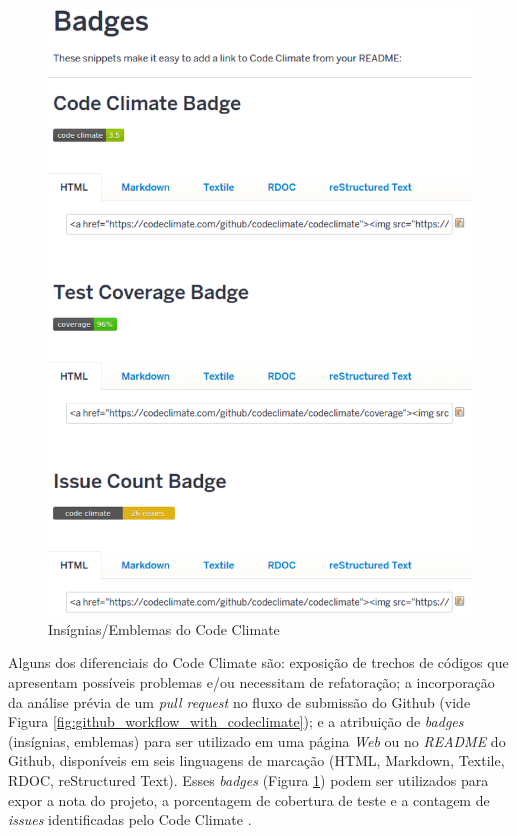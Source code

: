 \begin{figure}[!htb]
	\centering
    \includegraphics[keepaspectratio=true,scale=0.5]
    {figuras/codeclimate_badges.eps}
  \caption{Insígnias/Emblemas do Code Climate}
  \label{fig:codeclimate_badges}
\end{figure}

\newpage

Alguns dos diferenciais do Code Climate são: exposição de trechos de códigos que
apresentam possíveis problemas e/ou necessitam de refatoração; a incorporação da
análise prévia de um \textit{pull request} no fluxo de submissão do Github (vide
Figura \ref{fig:github_workflow_with_codeclimate}); e a
atribuição de \textit{badges} (insígnias, emblemas) para ser utilizado em uma
página \textit{Web} ou no \textit{README} do Github, disponíveis em seis
linguagens de marcação (HTML, Markdown, Textile, RDOC, reStructured Text).
Esses \textit{badges} (Figura \ref{fig:codeclimate_badges}) podem ser utilizados
para expor a nota do projeto, a porcentagem de cobertura de teste e a contagem
de \textit{issues} identificadas pelo Code Climate \cite{codeClimateDoc}.

